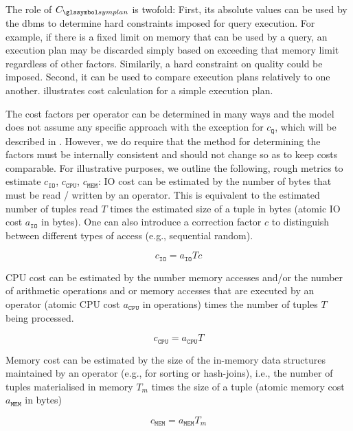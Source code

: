 The role of $C_{\symplan}$ is twofold: First, its absolute values can be used by the \acrshort{dbms} to determine hard constraints imposed for query execution. For example, if there is a fixed limit on memory that can be used by a query, an execution plan may be discarded simply based on exceeding that memory limit regardless of other factors. Similarily, a hard constraint on quality could be imposed. Second, it can be used to compare execution plans relatively to one another.  illustrates cost calculation for a simple execution plan.

The cost factors per operator can be determined in many ways and the model does not assume any specific approach with the exception for $c_{\mathtt{Q}}$, which will be described in . However, we do require that the method for determining the factors must be internally consistent and should not change so as to keep costs comparable. For illustrative purposes, we outline the following, rough metrics to estimate $c_{\mathtt{IO}}$, $c_{\mathtt{CPU}}$, $c_{\mathtt{MEM}}$: IO cost can be estimated by the number of bytes that must be read / written by an operator. This is equivalent to the estimated number of tuples read $T$ times the estimated size of a tuple in bytes (atomic IO cost $a_{\texttt{IO}}$ in bytes). One can also introduce a correction factor $c$ to distinguish between different types of access (e.g., sequential random).

\begin{equation*}
    c_{\mathtt{IO}} = a_{\texttt{IO}}Tc
\end{equation*}

CPU cost can be estimated by the number memory accesses and/or the number of arithmetic operations and or memory accesses that are executed by an operator (atomic CPU cost $a_{\texttt{CPU}}$ in operations) times the number of tuples $T$ being processed.

\begin{equation*}
    c_{\mathtt{CPU}} = a_{\texttt{CPU}}T
\end{equation*}

Memory cost can be estimated by the size of the in-memory data structures maintained by an operator (e.g., for sorting or hash-joins), i.e., the number of tuples materialised in memory $T_m$ times the size of a tuple (atomic memory cost $a_{\texttt{MEM}}$ in bytes)

\begin{equation*}
    c_{\mathtt{MEM}} = a_{\texttt{MEM}}T_m
\end{equation*}

